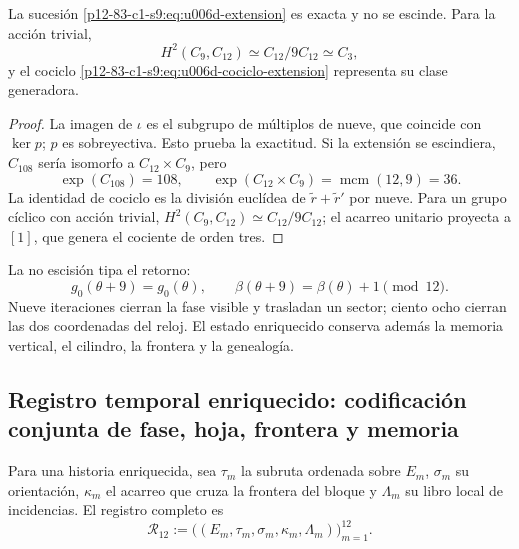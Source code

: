 {\begin{theorem}
\label{p12-83-c1-s9:thm:u006d-extension-no-escindida}
La sucesión \eqref{p12-83-c1-s9:eq:u006d-extension} es exacta y no se escinde. Para la
acción trivial,
\begin{equation}
 H^2(C_9,C_{12})
 \simeq C_{12}/9C_{12}
 \simeq C_3,
 \label{p12-83-c1-s9:eq:u006d-cohomologia-extension}
\end{equation}
y el cociclo \eqref{p12-83-c1-s9:eq:u006d-cociclo-extension} representa su clase
generadora.
\end{theorem}

\begin{proof}
La imagen de \(\iota\) es el subgrupo de múltiplos de nueve, que coincide
con \(\ker p\); \(p\) es sobreyectiva. Esto prueba la exactitud. Si la
extensión se escindiera, \(C_{108}\) sería isomorfo a
\(C_{12}\times C_9\), pero
\[
 \exp(C_{108})=108,
 \qquad
 \exp(C_{12}\times C_9)=\operatorname{mcm}(12,9)=36.
\]
La identidad de cociclo es la división euclídea de
\(\widetilde r+\widetilde r'\) por nueve. Para un grupo cíclico con acción
trivial,
\(H^2(C_9,C_{12})\simeq C_{12}/9C_{12}\); el acarreo unitario proyecta a
\([1]\), que genera el cociente de orden tres.
\end{proof}

La no escisión tipa el retorno:
\[
 g_0(\theta+9)=g_0(\theta),
 \qquad
 \beta(\theta+9)=\beta(\theta)+1\pmod{12}.
\]
Nueve iteraciones cierran la fase visible y trasladan un sector; ciento
ocho cierran las dos coordenadas del reloj. El estado enriquecido conserva
además la memoria vertical, el cilindro, la frontera y la genealogía.

\subsection{Registro temporal enriquecido: codificación conjunta de fase, hoja, frontera y memoria}

\begin{definition}
\label{p12-83-c1-s9:def:u006d-registro-dodecafasico}
Para una historia enriquecida, sea \(\tau_m\) la subruta ordenada sobre
\(E_m\), \(\sigma_m\) su orientación, \(\kappa_m\) el acarreo que cruza la
frontera del bloque y \(\Lambda_m\) su libro local de incidencias. El
registro completo es
\begin{equation}
 \mathcal R_{12}:=
 \bigl(
 (E_m,\tau_m,\sigma_m,\kappa_m,\Lambda_m)
 \bigr)_{m=1}^{12}.
 \label{p12-83-c1-s9:eq:u006d-registro-r12}
\end{equation}
\end{definition}

}
